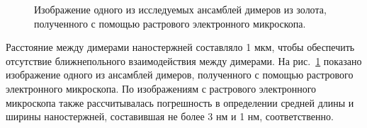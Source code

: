 \begin{figure}[!h]
\caption{Изображение одного из исследуемых ансамблей димеров из золота, полученного с помощью растрового электронного микроскопа.}
\label{img:SEMsample}
\end{figure}
Расстояние между димерами наностержней составляло 1 мкм, чтобы обеспечить отсутствие ближнепольного взаимодействия между димерами. На рис.~\ref{img:SEMsample} показано изображение одного из ансамблей димеров, полученного с помощью растрового электронного микроскопа.
По изображениям с растрового электронного микроскопа также рассчитывалась погрешность в определении средней длины и ширины наностержней, составившая не более 3 нм и 1 нм, соответственно.

